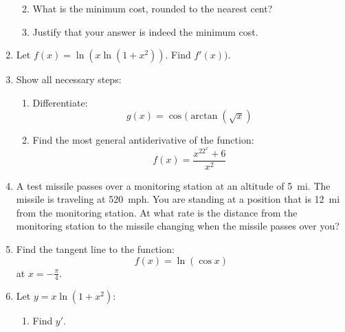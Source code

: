 \documentclass[letterpaper,12pt,fleqn]{article}
\begin{document}
\begin{enumerate}[left=0in]
\begin{enumerate}
    \vspace{2.5in}

  \item What is the minimum cost, rounded to the nearest cent?

    \vspace{1.5in}

  \item Justify that your answer is indeed the minimum cost.
  \end{enumerate}

  \newpage

\item Let \(f(x)=\ln(x\ln(1+x^2))\).  Find \(f'(x))\).

  \newpage

\item Show all necessary steps:

  \bigskip

  \begin{enumerate}
  \item Differentiate:
    \[g(x)=\cos(\arctan(\sqrt{x})\]

    \vspace{3in}

  \item Find the most general antiderivative of the function:
    \[f(x)=\frac{x^22^x+6}{x^2}\]
  \end{enumerate}

  \newpage

\item A test missile passes over a monitoring station at an altitude of \SI{5}{mi}.  The missile is traveling at
  \SI{520}{mph}.  You are standing at a position that is \SI{12}{mi} from the monitoring station.  At what rate is
  the distance from the monitoring station to the missile changing when the missile passes over you?

  \newpage

\item Find the tangent line to the function:
  \[f(x)=\ln(\cos x)\]
  at \(x=-\frac{\pi}{4}\).

  \newpage

\item Let \(y=x\ln(1+x^2)\):

  \bigskip

  \begin{enumerate}
  \item Find \(y'\).

    \vspace{3in}


\end{enumerate}
\end{enumerate}
\end{document}
